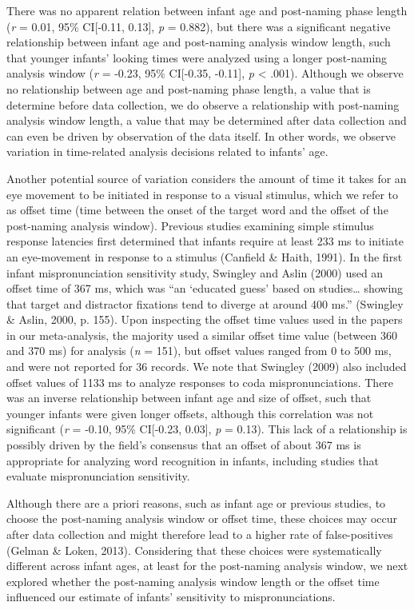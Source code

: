 \documentclass[man]{apa6}
\begin{document}
There was no apparent relation between infant age and post-naming phase length (\emph{r} = 0.01, 95\% CI{[}-0.11, 0.13{]}, \emph{p} = 0.882), but there was a significant negative relationship between infant age and post-naming analysis window length, such that younger infants' looking times were analyzed using a longer post-naming analysis window (\emph{r} = -0.23, 95\% CI{[}-0.35, -0.11{]}, \emph{p} \textless{} .001). Although we observe no relationship between age and post-naming phase length, a value that is determine before data collection, we do observe a relationship with post-naming analysis window length, a value that may be determined after data collection and can even be driven by observation of the data itself. In other words, we observe variation in time-related analysis decisions related to infants' age.

Another potential source of variation considers the amount of time it takes for an eye movement to be initiated in response to a visual stimulus, which we refer to as offset time (time between the onset of the target word and the offset of the post-naming analysis window). Previous studies examining simple stimulus response latencies first determined that infants require at least 233 ms to initiate an eye-movement in response to a stimulus (Canfield \& Haith, 1991). In the first infant mispronunciation sensitivity study, Swingley and Aslin (2000) used an offset time of 367 ms, which was \enquote{an \enquote{educated guess} based on studies\ldots{} showing that target and distractor fixations tend to diverge at around 400 ms.} (Swingley \& Aslin, 2000, p. 155). Upon inspecting the offset time values used in the papers in our meta-analysis, the majority used a similar offset time value (between 360 and 370 ms) for analysis (\emph{n} = 151), but offset values ranged from 0 to 500 ms, and were not reported for 36 records. We note that Swingley (2009) also included offset values of 1133 ms to analyze responses to coda mispronunciations. There was an inverse relationship between infant age and size of offset, such that younger infants were given longer offsets, although this correlation was not significant (\emph{r} = -0.10, 95\% CI{[}-0.23, 0.03{]}, \emph{p} = 0.13). This lack of a relationship is possibly driven by the field's consensus that an offset of about 367 ms is appropriate for analyzing word recognition in infants, including studies that evaluate mispronunciation sensitivity.

Although there are a priori reasons, such as infant age or previous studies, to choose the post-naming analysis window or offset time, these choices may occur after data collection and might therefore lead to a higher rate of false-positives (Gelman \& Loken, 2013). Considering that these choices were systematically different across infant ages, at least for the post-naming analysis window, we next explored whether the post-naming analysis window length or the offset time influenced our estimate of infants' sensitivity to mispronunciations.
\end{document}
